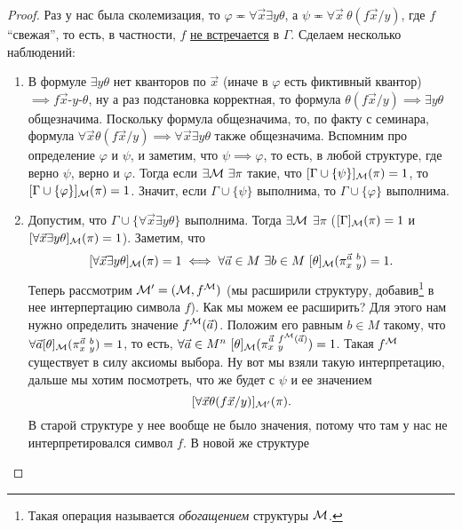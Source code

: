 \begin{proof}
    Раз у нас была сколемизация, то $\varphi \eqcirc \forall \vec{x} \exists y \theta$, а $\psi \eqcirc \forall \vec{x}~ \theta(f\vec{x}/y)$, где $f$ \enquote{свежая}, то есть, в частности, $f$ \underline{не встречается} в $\Gamma$.
    Сделаем несколько наблюдений:
    \begin{enumerate}
        \item В формуле $\exists y \theta$ нет кванторов по $\vec{x}$ (иначе в $\varphi$ есть фиктивный квантор) $\implies f\vec{x}$-$y$-$\theta$, ну а раз подстановка корректная, то формула $\theta(f\vec{x}/y) \implies \exists y \theta$ общезначима.
        Поскольку формула общезначима, то, по факту с семинара, формула $\forall \vec{x} \theta(f\vec{x}/y) \implies \forall \vec{x} \exists y \theta$ также общезначима.
        Вспомним про определение $\varphi$ и $\psi$, и заметим, что $\psi \implies \varphi$, то есть, в любой структуре, где верно $\psi$, верно и $\varphi$.
        Тогда если $\exists \mathcal{M}~ \exists \pi$ такие, что $[\Gamma \cup \{\psi\}]_{\mathcal{M}}(\pi) = 1$, то $[\Gamma \cup \{\varphi\}]_{\mathcal{M}}(\pi) = 1$.
        Значит, если $\Gamma \cup \{\psi\}$ выполнима, то $\Gamma \cup \{\varphi\}$ выполнима.
        \item Допустим, что $\Gamma \cup \{ \forall \vec{x} \exists y \theta \}$ выполнима.
        Тогда $\exists \mathcal{M}$ $\exists \pi$ ($[\Gamma]_{\mathcal{M}}(\pi) = 1$ и $[\forall \vec{x} \exists y \theta]_{\mathcal{M}}(\pi) = 1$).
        Заметим, что
        $$
            [\forall \vec{x} \exists y \theta]_{\mathcal{M}}(\pi) = 1 \iff \forall \vec{a} \in M~ \exists b \in M~ [\theta]_{\mathcal{M}}(\pi_{x~y}^{\vec{a}~b}) = 1.
        $$
        Теперь рассмотрим $\mathcal{M}^{\prime} = (\mathcal{M}, f^{\mathcal{M}})$ (мы расширили структуру, добавив\footnote{Такая операция называется {\it обогащением} структуры $\mathcal{M}$.} в нее интерпертацию символа $f$).
        Как мы можем ее расширить?
        Для этого нам нужно определить значение $f^{\mathcal{M}}(\vec{a})$.
        Положим его равным $b \in M$ такому, что $\forall \vec{a} [\theta]_{\mathcal{M}}(\pi_{x~y}^{\vec{a}~b}) = 1$, то есть, $\forall \vec{a} \in M^{n}~ [\theta]_{\mathcal{M}}(\pi_{x~y}^{\vec{a}~f^{\mathcal{M}}(\vec{a})}) = 1$.
        Такая $f^{\mathcal{M}}$ существует в силу аксиомы выбора.
        Ну вот мы взяли такую интерпретацию, дальше мы хотим посмотреть, что же будет с $\psi$ и ее значением
        $$
            [\forall \vec{x} \theta (f\vec{x}/y)]_{\mathcal{M}^{\prime}}(\pi).
        $$
        В старой структуре у нее вообще не было значения, потому что там у нас не интерпретировался символ $f$.
        В новой же структуре
        $$
$$
\end{enumerate}
\end{proof}
